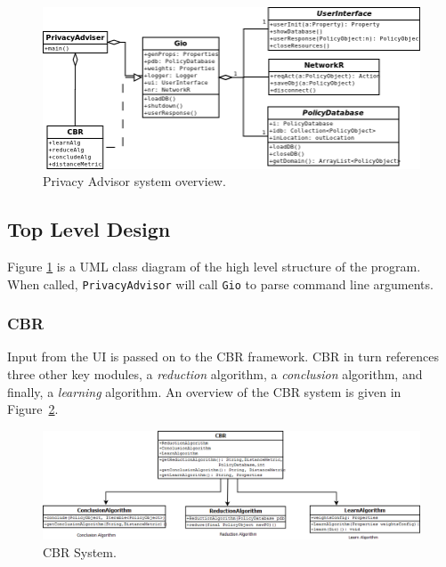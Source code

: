 \begin{figure}[htbp]
\begin{center}
\includegraphics[width = \textwidth]{DesignReport/uml/main_2.png}
\caption{Privacy Advisor system overview.}
\label{overviewFig}
\end{center}
\end{figure}


\subsection{Top Level Design}
Figure \ref{overviewFig} is a UML class diagram of the high level structure of the program. When called, \texttt{PrivacyAdvisor} will call \texttt{Gio} to parse command line arguments. 


\subsubsection{CBR} 
Input from the UI is passed on to the CBR framework. CBR in turn references three other key modules, a \emph{reduction} algorithm, a \emph{conclusion} algorithm, and finally, a \emph{learning} algorithm. An overview of the CBR system is given in Figure~\ref{cbr_fig}.

\begin{figure}[h!]
\begin{center}
\includegraphics[width = \textwidth]{DesignReport/uml/CBR.png}
\caption{CBR System.}
\label{cbr_fig}
\end{center}
\end{figure}

